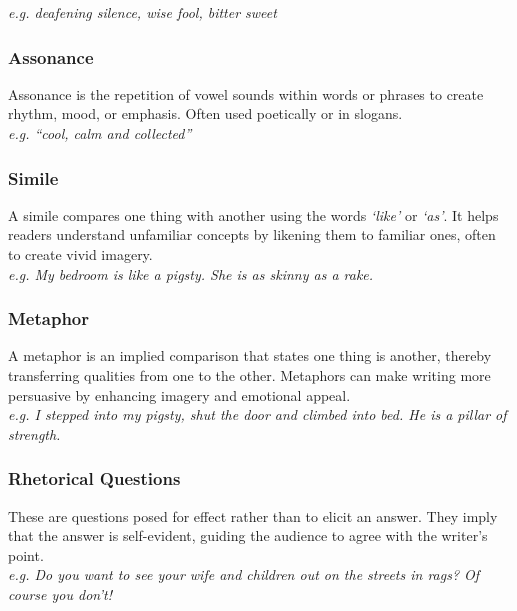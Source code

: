 \documentclass[a4paper]{article}
\begin{document}
\textit{e.g. deafening silence, wise fool, bitter sweet}\\

\subsubsection{Assonance}
Assonance is the repetition of vowel sounds within words or phrases to create rhythm, mood, or emphasis. Often used poetically or in slogans.\\

\textit{e.g. “cool, calm and collected”}\\

\subsubsection{Simile}
A simile compares one thing with another using the words \textit{‘like’} or \textit{‘as’}. It helps readers understand unfamiliar concepts by likening them to familiar ones, often to create vivid imagery.\\

\textit{e.g. My bedroom is like a pigsty. She is as skinny as a rake.}\\

\subsubsection{Metaphor}
A metaphor is an implied comparison that states one thing is another, thereby transferring qualities from one to the other. Metaphors can make writing more persuasive by enhancing imagery and emotional appeal.\\

\textit{e.g. I stepped into my pigsty, shut the door and climbed into bed. He is a pillar of strength.}\\

\subsubsection{Rhetorical Questions}
These are questions posed for effect rather than to elicit an answer. They imply that the answer is self-evident, guiding the audience to agree with the writer’s point.\\

\textit{e.g. Do you want to see your wife and children out on the streets in rags? Of course you don’t!}\\
\end{document}
